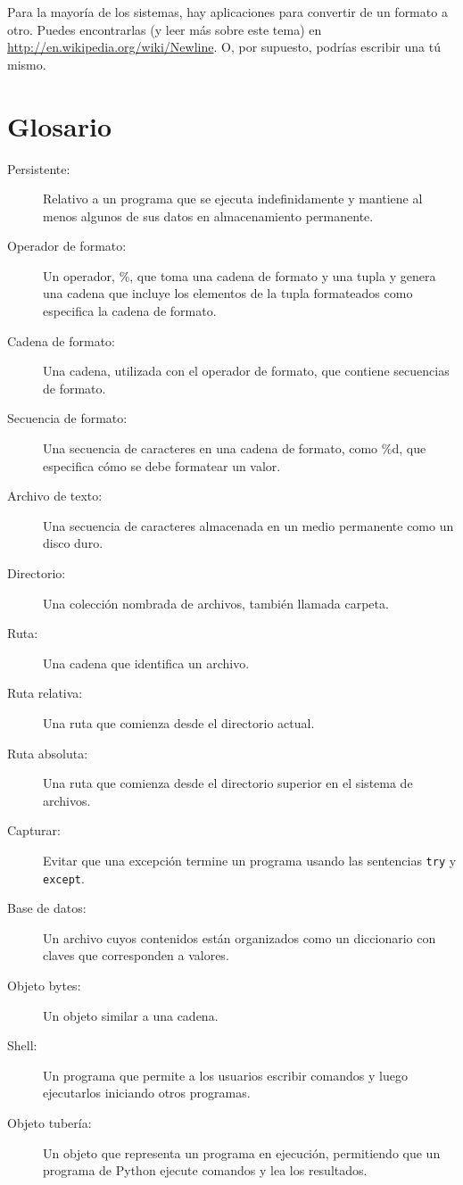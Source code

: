 Para la mayoría de los sistemas, hay aplicaciones para convertir de un formato a otro. Puedes encontrarlas (y leer más sobre este tema) en \url{http://en.wikipedia.org/wiki/Newline}. O, por supuesto, podrías escribir una tú mismo.

\section{Glosario}

\begin{description}
\item[Persistente:] Relativo a un programa que se ejecuta indefinidamente y mantiene al menos algunos de sus datos en almacenamiento permanente.

\item[Operador de formato:] Un operador, \%, que toma una cadena de formato y una tupla y genera una cadena que incluye los elementos de la tupla formateados como especifica la cadena de formato.

\item[Cadena de formato:] Una cadena, utilizada con el operador de formato, que contiene secuencias de formato.

\item[Secuencia de formato:] Una secuencia de caracteres en una cadena de formato, como \%d, que especifica cómo se debe formatear un valor.

\item[Archivo de texto:] Una secuencia de caracteres almacenada en un medio permanente como un disco duro.

\item[Directorio:] Una colección nombrada de archivos, también llamada carpeta.

\item[Ruta:] Una cadena que identifica un archivo.

\item[Ruta relativa:] Una ruta que comienza desde el directorio actual.

\item[Ruta absoluta:] Una ruta que comienza desde el directorio superior en el sistema de archivos.

\item[Capturar:] Evitar que una excepción termine un programa usando las sentencias \texttt{try} y \texttt{except}.

\item[Base de datos:] Un archivo cuyos contenidos están organizados como un diccionario con claves que corresponden a valores.

\item[Objeto bytes:] Un objeto similar a una cadena.

\item[Shell:] Un programa que permite a los usuarios escribir comandos y luego ejecutarlos iniciando otros programas.

\item[Objeto tubería:] Un objeto que representa un programa en ejecución, permitiendo que un programa de Python ejecute comandos y lea los resultados.
\end{description}

